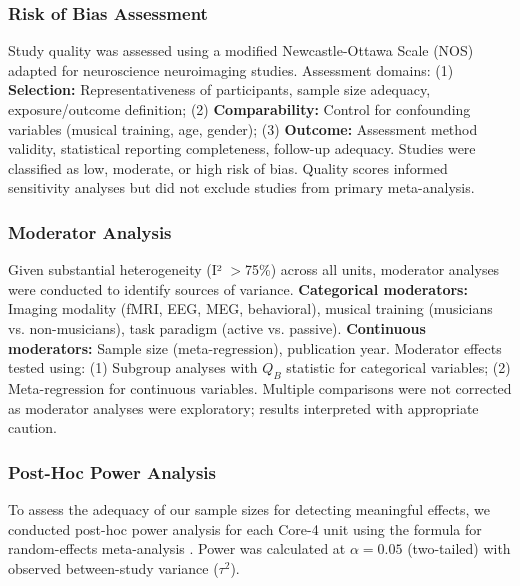 \documentclass[9pt,onecolumn]{article}
\begin{document}
\subsubsection{Risk of Bias Assessment}

Study quality was assessed using a modified Newcastle-Ottawa Scale (NOS) adapted for neuroscience neuroimaging studies. Assessment domains: (1) \textbf{Selection:} Representativeness of participants, sample size adequacy, exposure/outcome definition; (2) \textbf{Comparability:} Control for confounding variables (musical training, age, gender); (3) \textbf{Outcome:} Assessment method validity, statistical reporting completeness, follow-up adequacy. Studies were classified as low, moderate, or high risk of bias. Quality scores informed sensitivity analyses but did not exclude studies from primary meta-analysis.

\subsubsection{Moderator Analysis}

Given substantial heterogeneity (I² $>$75\%) across all units, moderator analyses were conducted to identify sources of variance. \textbf{Categorical moderators:} Imaging modality (fMRI, EEG, MEG, behavioral), musical training (musicians vs. non-musicians), task paradigm (active vs. passive). \textbf{Continuous moderators:} Sample size (meta-regression), publication year. Moderator effects tested using: (1) Subgroup analyses with $Q_B$ statistic for categorical variables; (2) Meta-regression for continuous variables. Multiple comparisons were not corrected as moderator analyses were exploratory; results interpreted with appropriate caution.

\subsubsection{Post-Hoc Power Analysis}

To assess the adequacy of our sample sizes for detecting meaningful effects, we conducted post-hoc power analysis for each Core-4 unit using the formula for random-effects meta-analysis \citep{borenstein2021}. Power was calculated at $\alpha = 0.05$ (two-tailed) with observed between-study variance ($\tau^2$).
\end{document}
